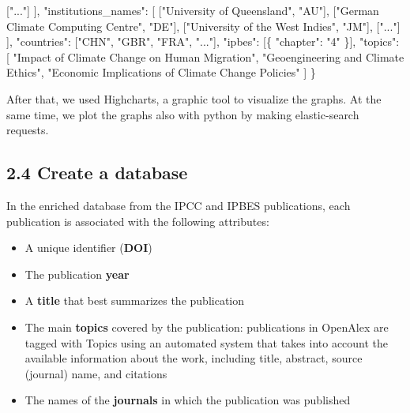 \documentclass[
]{article}
\newenvironment{Shaded}{}{}
\newcommand{\DataTypeTok}[1]{\textcolor[rgb]{0.56,0.13,0.00}{#1}}
\newcommand{\FunctionTok}[1]{\textcolor[rgb]{0.02,0.16,0.49}{#1}}
\newcommand{\OtherTok}[1]{\textcolor[rgb]{0.00,0.44,0.13}{#1}}
\newcommand{\StringTok}[1]{\textcolor[rgb]{0.25,0.44,0.63}{#1}}
\providecommand{\tightlist}{%
  \setlength{\itemsep}{0pt}\setlength{\parskip}{0pt}}
\begin{document}
\begin{Shaded}
\begin{Highlighting}[]
    \OtherTok{[}\StringTok{"..."}\OtherTok{]}
  \OtherTok{]}\FunctionTok{,}
  \DataTypeTok{"institutions\_names"}\FunctionTok{:} \OtherTok{[}
    \OtherTok{[}\StringTok{"University of Queensland"}\OtherTok{,} \StringTok{"AU"}\OtherTok{],}
    \OtherTok{[}\StringTok{"German Climate Computing Centre"}\OtherTok{,} \StringTok{"DE"}\OtherTok{],}
    \OtherTok{[}\StringTok{"University of the West Indies"}\OtherTok{,} \StringTok{"JM"}\OtherTok{],}
    \OtherTok{[}\StringTok{"..."}\OtherTok{]}
  \OtherTok{]}\FunctionTok{,}
  \DataTypeTok{"countries"}\FunctionTok{:} \OtherTok{[}\StringTok{"CHN"}\OtherTok{,} \StringTok{"GBR"}\OtherTok{,} \StringTok{"FRA"}\OtherTok{,} \StringTok{"..."}\OtherTok{]}\FunctionTok{,}
  \DataTypeTok{"ipbes"}\FunctionTok{:} \OtherTok{[}\FunctionTok{\{} \DataTypeTok{"chapter"}\FunctionTok{:} \StringTok{"4"} \FunctionTok{\}}\OtherTok{]}\FunctionTok{,}
  \DataTypeTok{"topics"}\FunctionTok{:} \OtherTok{[}
    \StringTok{"Impact of Climate Change on Human Migration"}\OtherTok{,}
    \StringTok{"Geoengineering and Climate Ethics"}\OtherTok{,}
    \StringTok{"Economic Implications of Climate Change Policies"}
  \OtherTok{]}
\FunctionTok{\}}
\end{Highlighting}
\end{Shaded}

After that, we used Highcharts, a graphic tool to visualize the graphs.
At the same time, we plot the graphs also with python by making
elastic-search requests.

\hypertarget{create-a-database}{%
\subsection{2.4 Create a database}\label{create-a-database}}

In the enriched database from the IPCC and IPBES publications, each
publication is associated with the following attributes:

\begin{itemize}
\tightlist
\item
  A unique identifier (\textbf{DOI})
\item
  The publication \textbf{year}
\item
  A \textbf{title} that best summarizes the publication
\item
  The main \textbf{topics} covered by the publication: publications in
  OpenAlex are tagged with Topics using an automated system that takes
  into account the available information about the work, including
  title, abstract, source (journal) name, and citations
\item
  The names of the \textbf{journals} in which the publication was
  published
\end{itemize}
\end{document}
